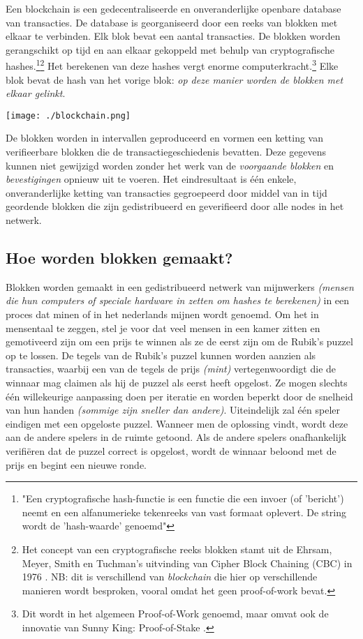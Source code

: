 \documentclass[11pt]{article}
\begin{document}
Een blockchain is een gedecentraliseerde en onveranderlijke openbare database van transacties. De database is georganiseerd door een reeks van blokken met elkaar te verbinden. Elk blok bevat een aantal transacties.
De blokken worden gerangschikt op tijd en aan elkaar gekoppeld met behulp van cryptografische hashes.\footnote{"Een cryptografische hash-functie is een functie die een invoer (of 'bericht') neemt en een alfanumerieke tekenreeks van vast formaat oplevert. De string wordt de 'hash-waarde' genoemd"\cite{wikihash}}\footnote{Het concept van een cryptografische reeks blokken stamt uit de Ehrsam, Meyer, Smith en Tuchman's uitvinding van Cipher Block Chaining (CBC) in 1976 \cite{cbc}. NB: dit is verschillend van \textit{blockchain} die hier op verschillende manieren wordt besproken, vooral omdat het geen proof-of-work bevat.}
Het berekenen van deze hashes vergt enorme computerkracht.\footnote{Dit wordt in het algemeen Proof-of-Work genoemd, maar omvat ook de innovatie van Sunny King: Proof-of-Stake \cite{peercoin}.} Elke blok bevat de hash van het vorige blok: \textit{op deze manier worden de blokken met elkaar gelinkt}.

\begin{center}
\texttt{[image: ./blockchain.png]}
\end{center}
De blokken worden in intervallen geproduceerd en vormen een ketting van verifieerbare blokken die de transactiegeschiedenis bevatten. Deze gegevens kunnen niet gewijzigd worden zonder het werk van de \textit{voorgaande blokken} en \textit{bevestigingen} opnieuw uit te voeren.
Het eindresultaat is \'e\'en enkele, onveranderlijke ketting van transacties gegroepeerd door middel van in tijd geordende blokken die zijn gedistribueerd en geverifieerd door alle nodes in het netwerk.

\subsection{Hoe worden blokken gemaakt?}

Blokken worden gemaakt in een gedistribueerd netwerk van mijnwerkers \textit{(mensen die hun computers of speciale hardware in zetten om hashes te berekenen)} in een proces dat minen of in het nederlands mijnen wordt genoemd.
Om het in mensentaal te zeggen, stel je voor dat veel mensen in een kamer zitten en gemotiveerd zijn om een ​​prijs te winnen als ze de eerst zijn om de Rubik's puzzel op te lossen. De tegels van de Rubik's puzzel kunnen worden aanzien als transacties, waarbij een van de tegels de prijs \textit{(mint)} vertegenwoordigt die de winnaar mag claimen als hij de puzzel als eerst heeft opgelost. 
Ze mogen slechts \'e\'en willekeurige aanpassing doen per iteratie en worden beperkt door de snelheid van hun handen \textit{(sommige zijn sneller dan andere)}.
Uiteindelijk zal \'e\'en speler eindigen met een opgeloste puzzel. Wanneer men de oplossing vindt, wordt deze aan de andere spelers in de ruimte getoond. Als de andere spelers onafhankelijk verifi\"eren dat de puzzel correct is opgelost, wordt de winnaar beloond met de prijs en begint een nieuwe ronde.
\end{document}
